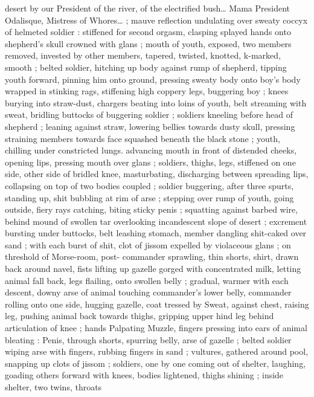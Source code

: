 desert by our President of the river, of the electrified bush{\ldots} Mama 
President Odalisque, Mistress of Whores{\ldots}{\gr} ; mauve reflection 
undulating over sweaty coccyx of helmeted soldier : stiffened for 
second orgasm, clasping splayed hands onto shepherd's skull 
crowned with glans ; mouth of youth, exposed, two members 
removed, invested by other members, tapered, twisted, knotted, 
k-marked, smooth ; belted soldier, hitching up body against rump 
of shepherd, tipping youth forward, pinning him onto ground, 
pressing sweaty body onto boy's body wrapped in stinking rags, 
stiffening high coppery legs, buggering boy ; knees burying into 
straw-dust, chargers beating into loins of youth, belt streaming with 
sweat, bridling buttocks of buggering soldier ; soldiers kneeling 
before head of shepherd ; leaning against straw, lowering bellies 
towards dusty skull, pressing straining members towards face 
squashed beneath the black stone ; youth, chilling under constricted 
lungs. advancing mouth in front of distended cheeks, opening lips, 
pressing mouth over glans ; soldiers, thighs, legs, stiffened on one 
side, other side of bridled knee, masturbating, discharging between 
spreading lips, collapsing on top of two bodies coupled ; soldier 
buggering, after three spurts, standing up, shit bubbling at rim of 
arse ; stepping over rump of youth, going outside, fiery rays 
catching, biting sticky penis ; squatting against barbed wire, behind 
mound of swollen tar overlooking incandescent slope of desert ; 
excrement bursting under buttocks, belt leashing stomach, member 
dangling shit-caked over sand ; with each burst of shit, clot of jissom 
expelled by violaceous glans ; on threshold of Morse-room, post- 
commander sprawling, thin shorts, shirt, drawn back around navel, 
fists lifting up gazelle gorged with concentrated milk, letting animal 
fall back, legs flailing, onto swollen belly ; gradual, warmer with each 
descent, downy arse of animal touching commander's lower belly, 
commander rolling onto one side, hugging gazelle, coat tressed by 
Sweat, against chest, raising leg, pushing animal back towards 
thighs, gripping upper hind leg behind articulation of knee ; hands 
Palpating Muzzle, fingers pressing into ears of animal bleating : 
Penis, through shorts, spurring belly, arse of gazelle ; belted soldier 
wiping arse with fingers, rubbing fingers in sand ; vultures, gathered 
around pool, snapping up clots of jissom ; soldiers, one by one 
coming out of shelter, laughing, goading others forward with knees, 
bodies lightened, thighs shining ; inside shelter, two twins, throats 
